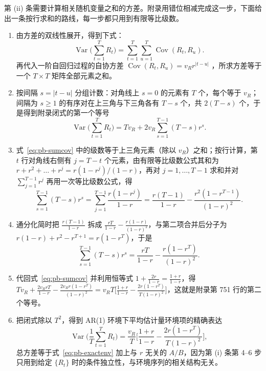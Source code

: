 第 (ii) 条需要计算相关随机变量之和的方差。附录用错位相减完成这一步，下面给出一条按行求和的路线，每一步都只用到有限等比级数。
\begin{enumerate}
\item 由方差的双线性展开，得到下式：
\begin{equation*}
\operatorname{Var}\Big(\sum_{t=1}^T R_t\Big)=\sum_{t=1}^T\sum_{u=1}^T\operatorname{Cov}(R_t,R_u).
\end{equation*}
再代入一阶自回归过程的自协方差 $\operatorname{Cov}(R_t,R_u)=v_Rr^{|t-u|}$ \citep{hamilton1994time}，所求方差等于一个 $T\times T$ 矩阵全部元素之和。
\item 按间隔 $s=|t-u|$ 分组计数：对角线上 $s=0$ 的元素有 $T$ 个，每个等于 $v_R$；间隔为 $s\ge1$ 的有序对在上三角与下三角各有 $T-s$ 个，共 $2(T-s)$ 个，于是得到附录闭式的第一个等号
\begin{equation}
\operatorname{Var}\Big(\sum_{t=1}^TR_t\Big)=Tv_R+2v_R\sum_{s=1}^{T-1}(T-s)r^s .\label{eq:pb-sumcov}
\end{equation}
\item 式~\eqref{eq:pb-sumcov} 中的级数等于上三角元素（除以 $v_R$）之和；按行计算，第 $t$ 行对角线右侧有 $j=T-t$ 个元素，由有限等比级数公式其和为 $r+r^2+\dots+r^j=r(1-r^j)/(1-r)$，再对 $j=1,\dots,T-1$ 求和并对 $\sum_{j=1}^{T-1}r^j$ 再用一次等比级数公式，得
\begin{equation*}
\sum_{s=1}^{T-1}(T-s)r^s=\sum_{j=1}^{T-1}\frac{r(1-r^j)}{1-r}=\frac{r(T-1)}{1-r}-\frac{r^2(1-r^{T-1})}{(1-r)^2}.
\end{equation*}
\item 通分化简时把 $\frac{r(T-1)}{1-r}$ 拆成 $\frac{rT}{1-r}-\frac{r(1-r)}{(1-r)^2}$，与第二项合并后分子为 $r(1-r)+r^2-r^{T+1}=r(1-r^T)$，于是
\begin{equation*}
\sum_{s=1}^{T-1}(T-s)r^s=\frac{rT}{1-r}-\frac{r(1-r^T)}{(1-r)^2}.
\end{equation*}
\item 代回式~\eqref{eq:pb-sumcov} 并利用恒等式 $1+\frac{2r}{1-r}=\frac{1+r}{1-r}$，得 $Tv_R+\frac{2v_RrT}{1-r}-\frac{2v_Rr(1-r^T)}{(1-r)^2}=v_RT\big[\frac{1+r}{1-r}-\frac{2r(1-r^T)}{T(1-r)^2}\big]$，这就是附录第 751 行的第二个等号。
\item 把闭式除以 $T^2$，得到 AR(1) 环境下平均估计量环境项的精确表达
\begin{equation}
\operatorname{Var}\Big(\frac1T\sum_{t=1}^TR_t\Big)=\frac{v_R}{T}\Big[\frac{1+r}{1-r}-\frac{2r(1-r^T)}{T(1-r)^2}\Big],\label{eq:pb-exactenv}
\end{equation}
总方差等于式~\eqref{eq:pb-exactenv} 加上与 $r$ 无关的 $A/B$，因为第 (i) 条第 4–6 步只用到给定 $\{R_t\}$ 时的条件独立性，与环境序列的相关结构无关。

\end{enumerate}
